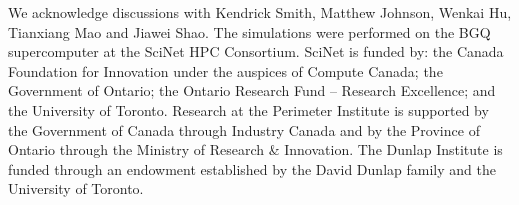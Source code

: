 
We acknowledge discussions with Kendrick Smith, Matthew Johnson, Wenkai Hu, Tianxiang Mao and Jiawei Shao.
The simulations were performed on the BGQ supercomputer 
at the SciNet HPC Consortium.
SciNet is funded by: the Canada Foundation for Innovation under the auspices 
of Compute Canada;
the Government of Ontario; the Ontario Research Fund -- Research Excellence;
and the University of Toronto.
Research at the Perimeter Institute is supported by the Government of Canada through Industry Canada and by the 
Province of Ontario through the Ministry of Research & Innovation. 
The Dunlap Institute is funded through an endowment
established by the David Dunlap family and the University of Toronto.
